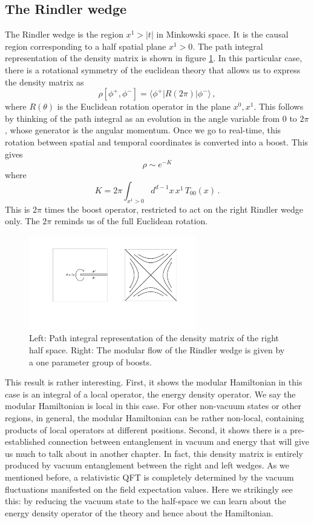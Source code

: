 \documentclass[12pt]{article}
\numberwithin{equation}{section}
\newcommand{\be}{\begin{equation}}
\newcommand{\ee}{\end{equation}}
\begin{document}
\subsection{The Rindler wedge}
\label{rw}
The Rindler wedge is the region $x^1>|t|$ in Minkowski space. It is the causal region corresponding to a half spatial plane $x^1>0$. The path integral representation of the density matrix is shown in figure \ref{rindler}. In this particular case, there is a rotational symmetry of the euclidean theory that allows us to express the density matrix as  
\be
\rho[\phi^+,\phi^-]=\langle \phi^+| R(2\pi) |\phi^- \rangle\,,
\ee
where $R(\theta)$ is the Euclidean rotation operator in the plane $x^0,x^1$. 
This follows by thinking of the path integral as an evolution in the angle variable from $0$ to $2\pi$, whose generator is the angular momentum.  
Once we go to real-time, this rotation between spatial and temporal coordinates is converted into a boost. This gives
\be
\rho\sim e^{- K}\label{pico}
\ee
where
\be
K=2 \pi \int_{x^1>0} d^{d-1}x\,  x^1\, T_{00}(x)\,.\label{pico1}
\ee
This is $2 \pi$ times the boost operator, restricted to act on the right Rindler wedge only. The $2\pi$ reminds us of the full Euclidean rotation.  

\begin{figure}[t]
\begin{center}  
\includegraphics[width=0.65\textwidth]{rindler.pdf}
\captionsetup{width=0.9\textwidth}
\caption{Left: Path integral representation of the density matrix of the right half space. Right: The modular flow of the Rindler wedge is given by a one parameter group of boosts.}
\label{rindler}
\end{center}  
\end{figure}

This result is rather interesting. First, it shows the modular Hamiltonian in this case is an integral of a local operator, the energy density operator. We say the modular Hamiltonian is local in this case. For other non-vacuum states or other regions, in general, the modular Hamiltonian can be rather non-local, containing products of local operators at different positions. Second, it shows there is a pre-established connection between entanglement in vacuum and energy that will give us much to talk about in another chapter. In fact, this density matrix is entirely produced by vacuum entanglement between the right and left wedges. As we mentioned before, a relativistic QFT is completely determined by the vacuum fluctuations manifested on the field expectation values. Here we strikingly see this: by reducing the vacuum state to the half-space we can learn about the energy density operator of the theory and hence about the Hamiltonian.      
\end{document}
